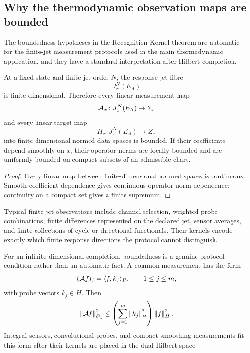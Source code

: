 \subsection{Why the thermodynamic observation maps are bounded}
\label{sec:measurement-operator-context}

The boundedness hypotheses in the Recognition Kernel theorem are automatic for the finite-jet measurement protocols used in the main thermodynamic application, and they have a standard interpretation after Hilbert completion.

\begin{proposition}
At a fixed state and finite jet order $N$, the response-jet fibre
\[
J_x^N(E_\Lambda)
\]
is finite dimensional.  Therefore every linear measurement map
\[
\mathcal A_x:J_x^N(E_\Lambda)\to Y_x
\]
and every linear target map
\[
\Pi_x:J_x^N(E_\Lambda)\to Z_x
\]
into finite-dimensional normed data spaces is bounded.  If their coefficients depend smoothly on $x$, their operator norms are locally bounded and are uniformly bounded on compact subsets of an admissible chart.
\end{proposition}

\begin{proof}
Every linear map between finite-dimensional normed spaces is continuous.  Smooth coefficient dependence gives continuous operator-norm dependence; continuity on a compact set gives a finite supremum.
\end{proof}

Typical finite-jet observations include channel selection, weighted probe combinations, finite differences represented on the declared jet, sensor averages, and finite collections of cycle or directional functionals.  Their kernels encode exactly which finite response directions the protocol cannot distinguish.

For an infinite-dimensional completion, boundedness is a genuine protocol condition rather than an automatic fact.  A common measurement has the form
\begin{equation}
(\mathcal A f)_j
=\langle f,k_j\rangle_H,
\qquad 1\le j\le m,
\label{eq:finite-probe-observation}
\end{equation}
with probe vectors $k_j\in H$.  Then
\begin{equation}
\left\lVert\mathcal A f\right\rVert_{\ell^2_m}^2
\le
\left(\sum_{j=1}^m\left\lVert k_j\right\rVert_H^2\right)
\left\lVert f\right\rVert_H^2.
\label{eq:probe-boundedness}
\end{equation}
Integral sensors, convolutional probes, and compact smoothing measurements fit this form after their kernels are placed in the dual Hilbert space.

